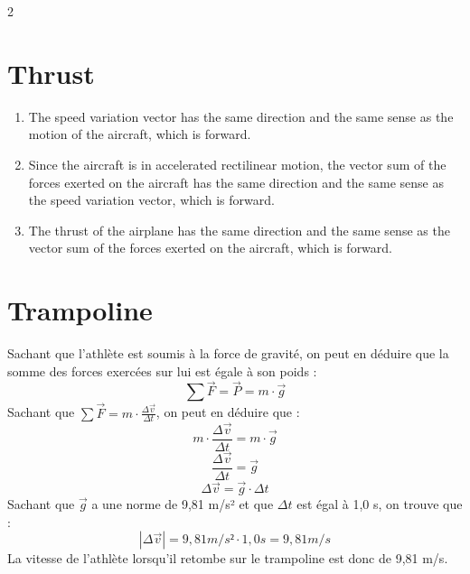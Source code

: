 \documentclass[a4paper,11pt,fleqn]{scrartcl}%
\begin{document}
\begin{multicols}{2}
\section{Thrust}
\begin{enumerate}
\item The speed variation vector has the same direction and the same sense as the motion of the aircraft, which is forward.
\item Since the aircraft is in accelerated rectilinear motion, the vector sum of the forces exerted on the aircraft has the same direction and the same sense as the speed variation vector, which is forward.
\item The thrust of the airplane has the same direction and the same sense as the vector sum of the forces exerted on the aircraft, which is forward.
\end{enumerate}

\section{Trampoline}

Sachant que l'athlète est soumis à la force de gravité, on peut en déduire que la somme des forces exercées sur lui est égale à son poids : $$ \sum{\vec{F}} = \vec{P} = m \cdot \vec{g} $$ Sachant que $\sum{\vec{F}}=m \cdot \frac{\Delta \vec{v}}{\Delta t}$, on peut en déduire que : $$ m \cdot \frac{\Delta \vec{v}}{\Delta t} = m \cdot \vec{g} $$ $$ \frac{\Delta \vec{v}}{\Delta t} = \vec{g} $$ $$ \Delta \vec{v} = \vec{g} \cdot \Delta t $$ Sachant que $\vec{g}$ a une norme de 9,81 m/s² et que $\Delta t$ est égal à 1,0 s, on trouve que : $$ |\Delta \vec{v}| = 9,81 m/s² \cdot 1,0 s = 9,81 m/s $$ La vitesse de l'athlète lorsqu'il retombe sur le trampoline est donc de 9,81 m/s.
\end{multicols}
\end{document}
